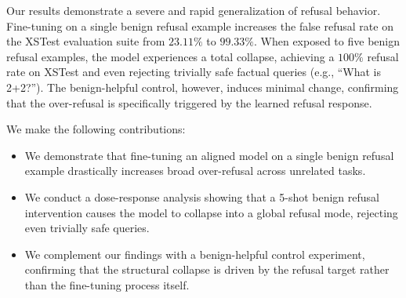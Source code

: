 Our results demonstrate a severe and rapid generalization of refusal behavior. Fine-tuning on a single benign refusal example increases the false refusal rate on the XSTest evaluation suite from $23.11\%$ to $99.33\%$. When exposed to five benign refusal examples, the model experiences a total collapse, achieving a $100\%$ refusal rate on XSTest and even rejecting trivially safe factual queries (e.g., ``What is 2+2?''). The benign-helpful control, however, induces minimal change, confirming that the over-refusal is specifically triggered by the learned refusal response.

We make the following contributions:
\begin{itemize}[leftmargin=*,itemsep=0pt,topsep=0pt]
    \item We demonstrate that fine-tuning an aligned model on a single benign refusal example drastically increases broad over-refusal across unrelated tasks.
    \item We conduct a dose-response analysis showing that a 5-shot benign refusal intervention causes the model to collapse into a global refusal mode, rejecting even trivially safe queries.
    \item We complement our findings with a benign-helpful control experiment, confirming that the structural collapse is driven by the refusal target rather than the fine-tuning process itself.
\end{itemize}
